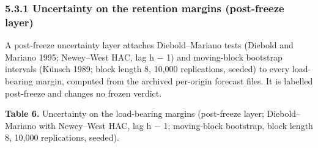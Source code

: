 \documentclass[11pt]{article}
\begin{document}
\subsubsection{5.3.1 Uncertainty on the retention margins (post-freeze
layer)}\label{edw-uncertainty-on-the-retention-margins-post-freeze-layer}

A post-freeze uncertainty layer attaches Diebold--Mariano tests (Diebold
and Mariano 1995; Newey--West HAC, lag h \ensuremath{-} 1) and moving-block bootstrap
intervals (K\"unsch 1989; block length 8, 10,000 replications, seeded) to
every load-bearing margin, computed from the archived per-origin
forecast files. It is labelled post-freeze and changes no frozen
verdict.

\textbf{Table 6.} Uncertainty on the load-bearing margins (post-freeze
layer; Diebold--Mariano with Newey--West HAC, lag h \ensuremath{-} 1; moving-block
bootstrap, block length 8, 10,000 replications, seeded).
\end{document}
